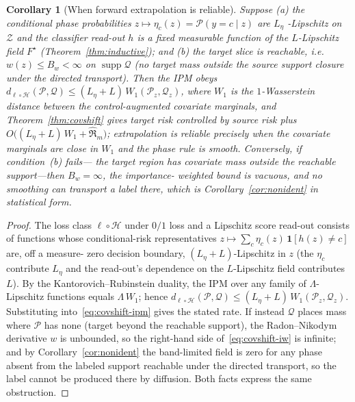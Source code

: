 \documentclass[aps,prresearch,reprint,amsmath,amssymb,nofootinbib,superscriptaddress,floatfix]{revtex4-2}
\newtheorem{corollary}[theorem]{Corollary}
\theoremstyle{definition}
\theoremstyle{remark}
\theoremstyle{plain}
\begin{document}
\begin{corollary}[When forward extrapolation is reliable]
\label{cor:extrap}
Suppose (a) the conditional phase probabilities $z\mapsto \eta_c(z)=\mathcal P(y=c\mid z)$ are $L_\eta$%
-Lipschitz on $\mathcal Z$ and the classifier read-out $h$ is a fixed measurable function of the
$L$-Lipschitz field $F^\star$ (Theorem~\ref{thm:inductive}); and (b) the target slice is reachable, i.e.\
$w(z)\le B_w<\infty$ on $\operatorname{supp}\mathcal Q$ (no target mass outside the source support closure
under the directed transport). Then the IPM obeys $d_{\ell\circ\mathcal H}(\mathcal P,\mathcal Q)\le
(L_\eta+L)\,W_1(\mathcal P_{\!z},\mathcal Q_z)$, where $W_1$ is the $1$-Wasserstein distance between the
control-augmented covariate marginals, and Theorem~\ref{thm:covshift} gives target risk controlled by source
risk plus $O\big((L_\eta+L)\,W_1+\widehat{\mathfrak R}_m\big)$; extrapolation is reliable precisely when the
covariate marginals are close in $W_1$ and the phase rule is smooth. Conversely, if condition~(b) fails---%
the target region has covariate mass outside the reachable support---then $B_w=\infty$, the importance-%
weighted bound is vacuous, and no smoothing can transport a label there, which is
Corollary~\ref{cor:nonident} in statistical form.
\end{corollary}
\begin{proof}
The loss class $\ell\circ\mathcal H$ under $0/1$ loss and a Lipschitz score read-out consists of functions
whose conditional-risk representatives $z\mapsto\sum_c\eta_c(z)\,\mathbf 1[h(z)\neq c]$ are, off a measure-%
zero decision boundary, $(L_\eta+L)$-Lipschitz in $z$ (the $\eta_c$ contribute $L_\eta$ and the read-out's
dependence on the $L$-Lipschitz field contributes $L$). By the Kantorovich--Rubinstein duality, the IPM over
any family of $\Lambda$-Lipschitz functions equals $\Lambda\,W_1$; hence
$d_{\ell\circ\mathcal H}(\mathcal P,\mathcal Q)\le(L_\eta+L)\,W_1(\mathcal P_{\!z},\mathcal Q_z)$.
Substituting into~\eqref{eq:covshift-ipm} gives the stated rate. If instead $\mathcal Q$ places mass where
$\mathcal P$ has none (target beyond the reachable support), the Radon--Nikodym derivative $w$ is unbounded,
so the right-hand side of~\eqref{eq:covshift-iw} is infinite; and by Corollary~\ref{cor:nonident} the
band-limited field is zero for any phase absent from the labeled support reachable under the directed
transport, so the label cannot be produced there by diffusion. Both facts express the same obstruction.
\end{proof}
\end{document}

